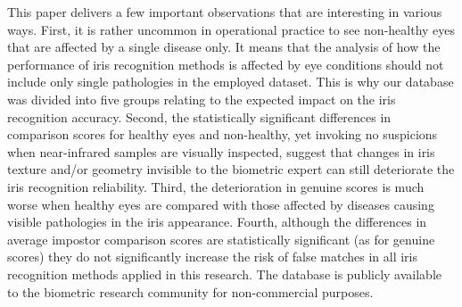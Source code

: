 \documentclass[conference]{IEEEtran}
\begin{document}
This paper delivers a few important observations that are interesting in various ways. First, it is rather uncommon in operational practice to see non-healthy eyes that are affected by a single disease only. It means that the analysis of how the performance of iris recognition methods is affected by eye conditions should not include only single pathologies in the employed dataset. This is why our database was divided into five groups relating to the expected impact on the iris recognition accuracy. Second, the statistically significant differences in comparison scores for healthy eyes and non-healthy, yet invoking no suspicions when near-infrared samples are visually inspected, suggest that changes in iris texture and/or geometry invisible to the biometric expert can still deteriorate the iris recognition reliability. Third, the deterioration in genuine scores is much worse when healthy eyes are compared with those affected by diseases causing visible pathologies in the iris appearance. Fourth, although the differences in average impostor comparison scores are statistically significant (as for genuine scores) they do not significantly increase the risk of false matches in all iris recognition methods applied in this research. The database is publicly available to the  biometric research community for non-commercial purposes.



\end{document}
